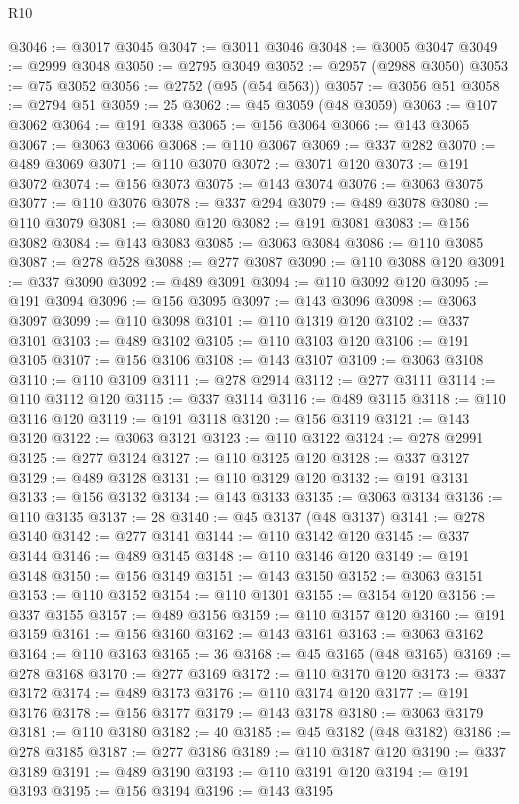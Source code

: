 \begin{lexlean}{R10}
\begin{coremodule}
{{{{{{{{{{{{{{{{{{{{{{{{{{{{{{{{{{{{{{{{{{{{{{{{{{{{{{{{{{{{{{{{{{{{{{{{{{{{{{{{{{{{@3046 := @3017 @3045
@3047 := @3011 @3046
@3048 := @3005 @3047
@3049 := @2999 @3048
@3050 := @2795 @3049
@3052 := @2957 (@2988 @3050)
@3053 := @75 @3052
@3056 := @2752 (@95 (@54 @563))
@3057 := @3056 @51
@3058 := @2794 @51
@3059 := 25
@3062 := @45 @3059 (@48 @3059)
@3063 := @107 @3062
@3064 := @191 @338
@3065 := @156 @3064
@3066 := @143 @3065
@3067 := @3063 @3066
@3068 := @110 @3067
@3069 := @337 @282
@3070 := @489 @3069
@3071 := @110 @3070
@3072 := @3071 @120
@3073 := @191 @3072
@3074 := @156 @3073
@3075 := @143 @3074
@3076 := @3063 @3075
@3077 := @110 @3076
@3078 := @337 @294
@3079 := @489 @3078
@3080 := @110 @3079
@3081 := @3080 @120
@3082 := @191 @3081
@3083 := @156 @3082
@3084 := @143 @3083
@3085 := @3063 @3084
@3086 := @110 @3085
@3087 := @278 @528
@3088 := @277 @3087
@3090 := @110 @3088 @120
@3091 := @337 @3090
@3092 := @489 @3091
@3094 := @110 @3092 @120
@3095 := @191 @3094
@3096 := @156 @3095
@3097 := @143 @3096
@3098 := @3063 @3097
@3099 := @110 @3098
@3101 := @110 @1319 @120
@3102 := @337 @3101
@3103 := @489 @3102
@3105 := @110 @3103 @120
@3106 := @191 @3105
@3107 := @156 @3106
@3108 := @143 @3107
@3109 := @3063 @3108
@3110 := @110 @3109
@3111 := @278 @2914
@3112 := @277 @3111
@3114 := @110 @3112 @120
@3115 := @337 @3114
@3116 := @489 @3115
@3118 := @110 @3116 @120
@3119 := @191 @3118
@3120 := @156 @3119
@3121 := @143 @3120
@3122 := @3063 @3121
@3123 := @110 @3122
@3124 := @278 @2991
@3125 := @277 @3124
@3127 := @110 @3125 @120
@3128 := @337 @3127
@3129 := @489 @3128
@3131 := @110 @3129 @120
@3132 := @191 @3131
@3133 := @156 @3132
@3134 := @143 @3133
@3135 := @3063 @3134
@3136 := @110 @3135
@3137 := 28
@3140 := @45 @3137 (@48 @3137)
@3141 := @278 @3140
@3142 := @277 @3141
@3144 := @110 @3142 @120
@3145 := @337 @3144
@3146 := @489 @3145
@3148 := @110 @3146 @120
@3149 := @191 @3148
@3150 := @156 @3149
@3151 := @143 @3150
@3152 := @3063 @3151
@3153 := @110 @3152
@3154 := @110 @1301
@3155 := @3154 @120
@3156 := @337 @3155
@3157 := @489 @3156
@3159 := @110 @3157 @120
@3160 := @191 @3159
@3161 := @156 @3160
@3162 := @143 @3161
@3163 := @3063 @3162
@3164 := @110 @3163
@3165 := 36
@3168 := @45 @3165 (@48 @3165)
@3169 := @278 @3168
@3170 := @277 @3169
@3172 := @110 @3170 @120
@3173 := @337 @3172
@3174 := @489 @3173
@3176 := @110 @3174 @120
@3177 := @191 @3176
@3178 := @156 @3177
@3179 := @143 @3178
@3180 := @3063 @3179
@3181 := @110 @3180
@3182 := 40
@3185 := @45 @3182 (@48 @3182)
@3186 := @278 @3185
@3187 := @277 @3186
@3189 := @110 @3187 @120
@3190 := @337 @3189
@3191 := @489 @3190
@3193 := @110 @3191 @120
@3194 := @191 @3193
@3195 := @156 @3194
@3196 := @143 @3195
}}}}}}}}}}}}}}}}}}}}}}}}}}}}}}}}}}}}}}}}}}}}}}}}}}}}}}}}}}}}}}}}}}}}}}}}}}}}}}}}}}}}
\end{coremodule}
\end{lexlean}
